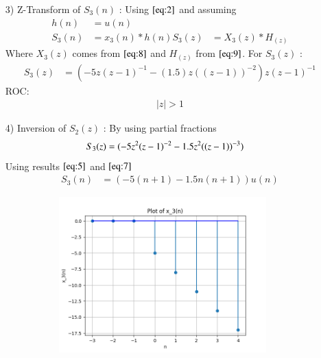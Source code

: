 \documentclass[journal,12pt,twocolumn]{IEEEtran}
\theoremstyle{remark}
\begin{document}
\begin{enumerate}
    \vspace{0.7cm}
\item[3)]
Z-Transform of $S_3(n)$ :
Using $\eqref{eq:2}$ and assuming 
\begin{align}
         h(n) &= u(n) \\
    S_3(n) &= x_3(n) * h(n) 
    S_3(z) &= X_3(z) * H_(z)
    \end{align}
    Where $X_3(z)$ comes from $\eqref{eq:8}$ and $H_(z)$ from $\eqref{eq:9}$.
    \vspace{0.05cm}
    For $S_3(z)$ :
    \begin{align}
            S_3(z) &= (-5z(z-1)^{-1}-
       (1.5)z((z-1))^{-2})z(z-1)^{-1}
    \end{align}
    ROC:
    \begin{align} 
    \lvert z \rvert > 1
    \end{align}
    
    \item[4)]
Inversion of $S_2(z)$ :
By using partial fractions 
\begin{align}
    S_3(z) &= \notag(-5z^2(z-1)^{-2} - 1.5z^2((z-1))^{-3}) 
\end{align}
Using results $\eqref{eq:5}$ and $\eqref{eq:7}$
\begin{align}
 S_3(n) &= (-5(n+1) - 1.5n(n+1))u(n)   
\end{align}
\begin{figure}[!ht]   
\centering
\graphicspath{ {figs/} }
\includegraphics[width=10cm, height=6cm]{graph_3}
\captionsetup{Graph:3 $x_3(n)$ vs n }
\label{graph:4}
\end{figure}

 
\end{enumerate}
\end{document}
